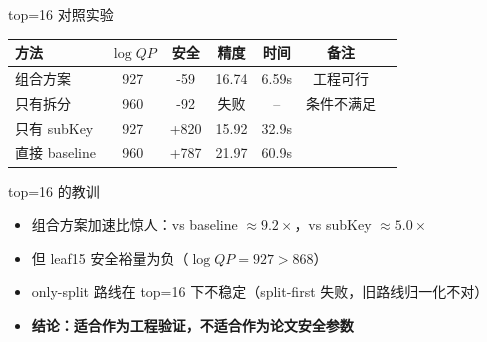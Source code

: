\documentclass[aspectratio=169, 10pt, xcolor=svgnames, table, UTF8]{ctexbeamer}
\begin{document}
\begin{frame}{top=16 对照实验}
  \begin{center}
    \small
    \begin{tabular}{@{}lcccccc@{}}
      \toprule
      方法 & \(\log QP\) & 安全 & 精度 & 时间 & 备注 \\
      \midrule
      组合方案 & 927 & -59 & \alert{16.74} & 6.59s & 工程可行 \\
      只有拆分 & 960 & -92 & 失败 & -- & 条件不满足 \\
      只有 subKey & 927 & +820 & 15.92 & 32.9s & \\
      直接 baseline & 960 & +787 & 21.97 & 60.9s & \\
      \bottomrule
    \end{tabular}
  \end{center}
  
  \pause
  
  \begin{alertblock}{top=16 的教训}
    \begin{itemize}
      \item 组合方案加速比惊人：vs baseline \(\approx 9.2\times\)，vs subKey \(\approx 5.0\times\)
      \item 但 leaf15 安全裕量为负（\(\log QP = 927 > 868\)）
      \item only-split 路线在 top=16 下不稳定（split-first 失败，旧路线归一化不对）
      \item \textbf{结论：适合作为工程验证，不适合作为论文安全参数}
    \end{itemize}
  \end{alertblock}
\end{frame}
\end{document}
